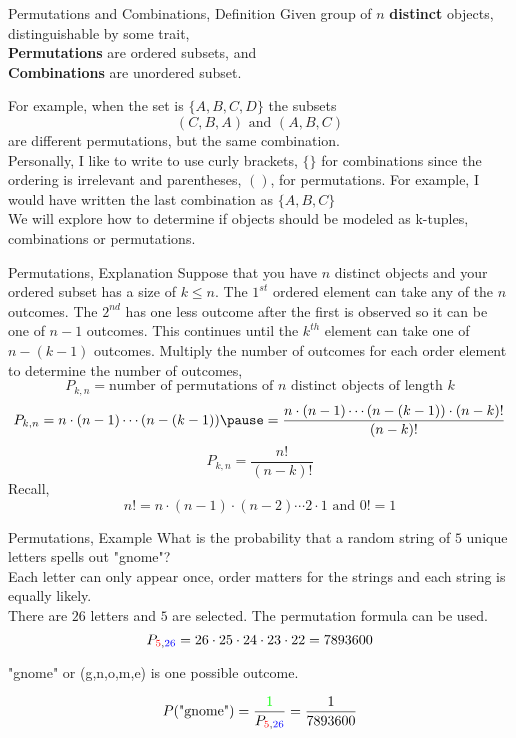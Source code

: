 \documentclass[handout]{beamer}
\newcommand{\blue}[1]{{\color{blue} #1}}
\newcommand{\red}[1]{{\color{red} #1}}
\newcommand{\grn}[1]{{\color{green} #1}}
\newcommand{\nl}[1]{\vspace{#1 em}}
\begin{document}
\begin{frame}{Permutations and Combinations, Definition}
    Given group of $n$ {\bf distinct} objects, distinguishable by some trait, \\
    \nl{0.5}
    {\bf Permutations} are ordered subsets,
    and\\
    \nl{0.5}
    {\bf Combinations} are unordered subset.

    For example, when the set is $\{ A, B, C, D\}$ the subsets
    \[(C, B, A) \text{ and } (A, B, C)\]
    are different permutations, but the same combination.\\
    \nl{0.5}
    \pause Personally, I like to write to use curly brackets, $\{\}$ for combinations since the ordering is irrelevant and parentheses, $()$, for permutations. For example, I would have written the last combination as $\{A,B,C\}$\\ 
    \nl{0.5}
    We will explore how to determine if objects should be modeled as k-tuples, combinations or permutations.
\end{frame}

\begin{frame}{Permutations, Explanation}
    Suppose that you have $n$ distinct objects and your ordered subset has a size of $k\leq n$. The $1^{st}$ ordered element can take any of the $n$ outcomes. The $2^{nd}$ has one less outcome after the first is observed so it can be one of $n-1$ outcomes. This continues until the $k^{th}$ element can take one of $n-(k-1)$ outcomes. \pause Multiply the number of outcomes for each order element to determine the number of outcomes, 
    \[P_{k,n} = \text{number of permutations of } n \text{ distinct objects of length } k \]
    \[P_{k,n} = n\cdot (n-1) \cdots  (n-(k-1)) \pause = \frac{n\cdot (n-1) \cdots  (n-(k-1)) \cdot(n-k)!}{(n-k)!}\]
    \[ P_{k,n} =\frac{n!}{(n-k)!}\]
    Recall,
    \[n! = n\cdot(n-1)\cdot(n-2) \cdots 2 \cdot 1 \text{ and } 0! =1\]
\end{frame}

\begin{frame}{Permutations, Example}
    What is the probability that a random string of $5$ unique letters spells out "gnome"?
    \\
    \pause \nl{0.5} Each letter can only appear once, order matters for the strings and each string is equally likely.
    \\
    \nl{0.5}
    There are \blue{$26$ letters} and \red{$5$ are selected}. The permutation formula can be used.
    \[P_{\red{5},\blue{26}} = 26 \cdot 25 \cdot 24 \cdot 23 \cdot 22 = 7893600\]

    \pause "gnome" or (g,n,o,m,e) is \grn{one} possible outcome.

    \[P(\text{"gnome"}) = \frac{\grn{1}}{P_{\red{5},\blue{26}}} = \frac{1}{7893600}\]
    
\end{frame}
\end{document}
